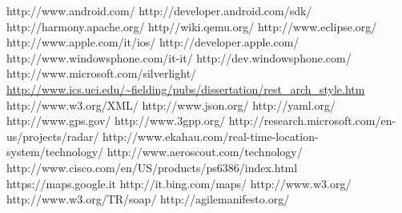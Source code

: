 
\begin{thesitography}{9}
 http://www.android.com/
 http://developer.android.com/sdk/
 http://harmony.apache.org/
 http//wiki.qemu.org/
 http://www.eclipse.org/
 http://www.apple.com/it/ios/
 http://developer.apple.com/
 http://www.windowsphone.com/it-it/
 http://dev.windowsphone.com/
 http://www.microsoft.com/silverlight/
 \url{http://www.ics.uci.edu/~fielding/pubs/dissertation/rest_arch_style.htm}
 http://www.w3.org/XML/
 http://www.json.org/
 http://yaml.org/
 http://www.gps.gov/
 http://www.3gpp.org/
 http://research.microsoft.com/en-us/projects/radar/
 http://www.ekahau.com/real-time-location-system/technology/
 http://www.aeroscout.com/technology/
 http://www.cisco.com/en/US/products/ps6386/index.html
 https://maps.google.it
 http://it.bing.com/maps/
 http://www.w3.org/
 http://www.w3.org/TR/soap/
 http://agilemanifesto.org/
\end{thesitography}

\clearpage{\pagestyle{empty}\cleardoublepage}
